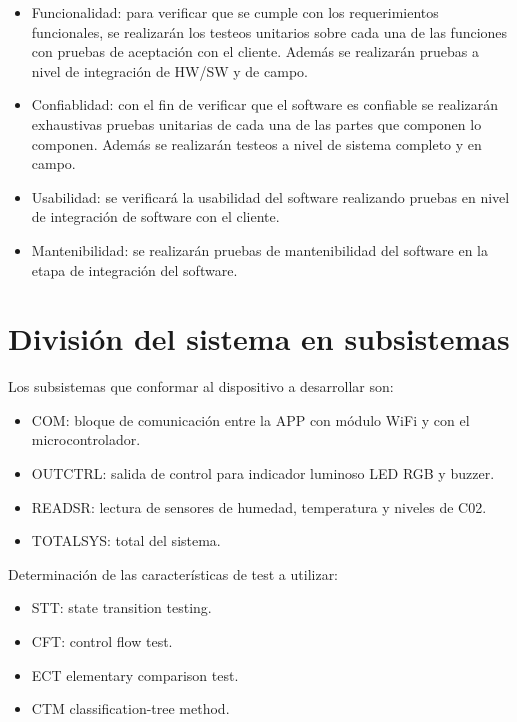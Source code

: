\documentclass[12pt,a4paper, twosite]{article}
\begin{document}
\begin{itemize}
    \item Funcionalidad: para verificar que se cumple con los requerimientos
          funcionales, se realizarán los testeos unitarios sobre cada una de las
          funciones con pruebas de aceptación con el cliente. Además se realizarán
          pruebas a nivel de integración de HW/SW y de campo.
    \item Confiablidad: con el fin de verificar que el software es confiable se
          realizarán exhaustivas pruebas unitarias de cada una de las partes que componen
          lo componen. Además se realizarán testeos a nivel de sistema completo y en
          campo.
    \item Usabilidad: se verificará la usabilidad del software realizando pruebas
          en nivel de integración de software con el cliente.
    \item Mantenibilidad: se realizarán pruebas de mantenibilidad del software en
          la etapa de integración del software.
\end{itemize}

\section{División del sistema en subsistemas}

Los subsistemas que conformar al dispositivo a desarrollar son:
\begin{itemize}
    \item COM: bloque de comunicación entre la APP con módulo WiFi y con el
          microcontrolador.
    \item OUTCTRL: salida de control para indicador luminoso LED RGB y buzzer.
    \item READSR: lectura de sensores de humedad, temperatura y niveles de C02.
    \item TOTALSYS: total del sistema.
\end{itemize}

Determinación de las características de test a utilizar:
\begin{itemize}
    \item STT: state transition testing.
    \item CFT: control flow test.
    \item ECT elementary comparison test.
    \item CTM classification-tree method.
\end{itemize}
\end{document}
